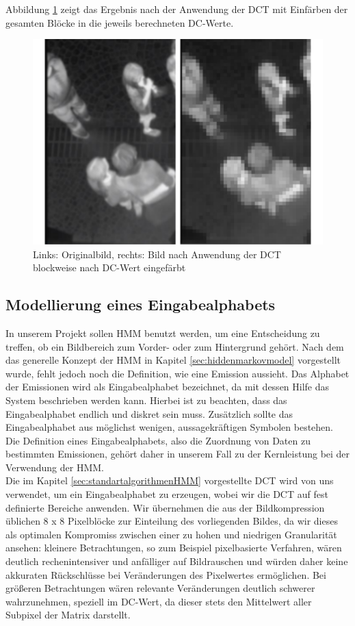 Abbildung \ref{fig:dct} zeigt das Ergebnis nach der Anwendung der DCT mit Einfärben der gesamten Blöcke in die jeweils berechneten DC-Werte.
\begin{figure}[H]
	\centering
	\includegraphics[width=1\textwidth]{bilder/03_dct_dc-only.pdf}
\caption{Links: Originalbild, rechts: Bild nach Anwendung der DCT blockweise nach DC-Wert eingefärbt}
	\label{fig:dct}
\end{figure}

\subsection{Modellierung eines Eingabealphabets}
\label{sec:modellierungeingabealphabet}
In unserem Projekt sollen HMM benutzt werden, um eine Entscheidung zu treffen, ob ein Bildbereich zum Vorder- oder zum Hintergrund gehört.
Nach dem das generelle Konzept der HMM in Kapitel \ref{sec:hiddenmarkovmodel} vorgestellt wurde, fehlt jedoch noch die Definition, wie eine Emission aussieht.
Das Alphabet der Emissionen wird als Eingabealphabet bezeichnet, da mit dessen Hilfe das System beschrieben werden kann.
Hierbei ist zu beachten, dass das Eingabealphabet endlich und diskret sein muss.
Zusätzlich sollte das Eingabealphabet aus möglichst wenigen, aussagekräftigen Symbolen bestehen.
Die Definition eines Eingabealphabets, also die Zuordnung von Daten zu bestimmten Emissionen, gehört daher in unserem Fall zu der Kernleistung bei der Verwendung der HMM.\\
Die im Kapitel \ref{sec:standartalgorithmenHMM} vorgestellte DCT wird von uns verwendet, um ein Eingabealphabet zu erzeugen, wobei wir die DCT auf fest definierte Bereiche anwenden.
Wir übernehmen die aus der Bildkompression üblichen 8 x 8 Pixelblöcke zur Einteilung des vorliegenden Bildes, da wir dieses als optimalen Kompromiss zwischen einer zu hohen und niedrigen Granularität ansehen: kleinere Betrachtungen, so zum Beispiel pixelbasierte Verfahren, wären deutlich rechenintensiver und anfälliger auf Bildrauschen und würden daher keine akkuraten Rückschlüsse bei Veränderungen des Pixelwertes ermöglichen.
Bei größeren Betrachtungen wären relevante Veränderungen deutlich schwerer wahrzunehmen, speziell im DC-Wert, da dieser stets den Mittelwert aller Subpixel der Matrix darstellt.

